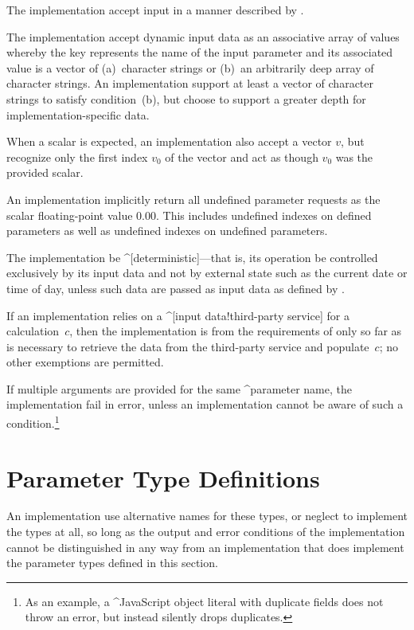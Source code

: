 
\label{s:indata}


The implementation \shall accept input in a manner described by
.

 The implementation \shall accept dynamic input data as an
associative array of values whereby the key represents the name of the input
parameter and its associated value is a vector of (a)~character strings or
(b)~an arbitrarily deep array of character strings. An implementation \shall
support at least a vector of character strings to satisfy condition~(b), but
\may choose to support a greater depth for implementation-specific data.

 When a scalar is expected, an implementation \shall also
accept a vector $v$, but \shall recognize only the first index $v_0$ of the
vector and \shall act as though $v_0$ was the provided scalar.

An implementation \shall implicitly return all undefined parameter requests as
the scalar floating-point value $0.00$. This includes undefined indexes on
defined parameters as well as undefined indexes on undefined parameters.

 The implementation \shall be ^[deterministic]---that is, its
operation \shall be controlled exclusively by its input data and not by external
state such as the current date or time of day, unless such data are passed as
input data as defined by .

If an implementation relies on a ^[input data!third-party service] for a
calculation~$c$, then the implementation is \exempt from the requirements of
 only so far as is necessary to retrieve the data from the
third-party service and populate~$c$; no other exemptions are permitted.

If multiple arguments are provided for the same ^parameter name, the
implementation \must fail in error, unless an implementation cannot be aware of
such a condition.\footnote{As an example, a ^JavaScript object literal with
duplicate fields does not throw an error, but instead silently drops
duplicates.}



\section{Parameter Type Definitions}
\label{s:paramtypes}
An implementation \may use alternative names for these types, or neglect to
implement the types at all, so long as the output and error conditions of the
implementation cannot be distinguished in any way from an implementation that
does implement the parameter types defined in this section.

